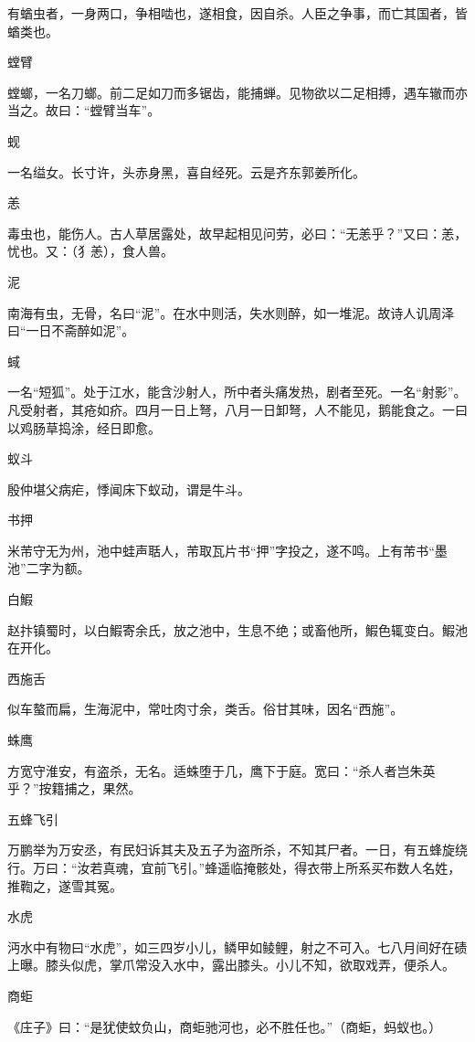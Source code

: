 \documentclass[a4paper,12pt,UTF8,twoside]{ctexbook}
\begin{document}
    有蝤虫者，一身两口，争相啮也，遂相食，因自杀。人臣之争事，而亡其国者，皆蝤类也。
    
    螳臂
    
    螳螂，一名刀螂。前二足如刀而多锯齿，能捕蝉。见物欲以二足相搏，遇车辙而亦当之。故曰：“螳臂当车”。
    
    蚬
    
    一名缢女。长寸许，头赤身黑，喜自经死。云是齐东郭姜所化。
    
    恙
    
    毒虫也，能伤人。古人草居露处，故早起相见问劳，必曰：“无恙乎？”又曰：恙，忧也。又：（犭恙），食人兽。
    
    泥
    
    南海有虫，无骨，名曰“泥”。在水中则活，失水则醉，如一堆泥。故诗人讥周泽曰“一日不斋醉如泥”。
    
    蜮
    
    一名“短狐”。处于江水，能含沙射人，所中者头痛发热，剧者至死。一名“射影”。凡受射者，其疮如疥。四月一日上弩，八月一日卸弩，人不能见，鹅能食之。一曰以鸡肠草捣涂，经日即愈。
    
    蚁斗
    
    殷仲堪父病疟，悸闻床下蚁动，谓是牛斗。
    
    书押
    
    米芾守无为州，池中蛙声聒人，芾取瓦片书“押”字投之，遂不鸣。上有芾书“墨池”二字为额。
    
    白鰕
    
    赵抃镇蜀时，以白鰕寄余氏，放之池中，生息不绝；或畜他所，鰕色辄变白。鰕池在开化。
    
    西施舌
    
    似车螯而扁，生海泥中，常吐肉寸余，类舌。俗甘其味，因名“西施”。
    
    蛛鹰
    
    方宽守淮安，有盗杀，无名。适蛛堕于几，鹰下于庭。宽曰：“杀人者岂朱英乎？”按籍捕之，果然。
    
    五蜂飞引
    
    万鹏举为万安丞，有民妇诉其夫及五子为盗所杀，不知其尸者。一日，有五蜂旋绕行。万曰：“汝若真魂，宜前飞引。”蜂遥临掩骸处，得衣带上所系买布数人名姓，推鞫之，遂雪其冤。
    
    水虎
    
    沔水中有物曰“水虎”，如三四岁小儿，鳞甲如鲮鲤，射之不可入。七八月间好在碛上曝。膝头似虎，掌爪常没入水中，露出膝头。小儿不知，欲取戏弄，便杀人。
    
    商蚷
    
    《庄子》曰：“是犹使蚊负山，商蚷驰河也，必不胜任也。”（商蚷，蚂蚁也。）
    
\end{document}
